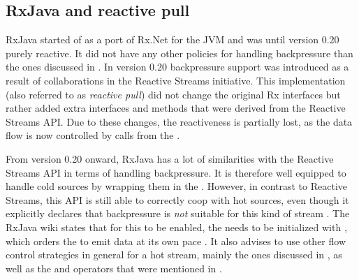 \subsection{RxJava and reactive pull}
\label{subsec:handling-overproduction-with-rxjava}
RxJava started of as a port of Rx.Net for the JVM and was until version 0.20 purely reactive. It did not have any other policies for handling backpressure than the ones discussed in . In version 0.20 backpressure support was introduced as a result of collaborations in the Reactive Streams initiative. This implementation (also referred to as \textit{reactive pull}) did not change the original Rx interfaces but rather added extra interfaces and methods that were derived from the Reactive Streams API. Due to these changes, the reactiveness is partially lost, as the data flow is now controlled by  calls from the \obv.

From version 0.20 onward, RxJava has a lot of similarities with the Reactive Streams API in terms of handling backpressure. It is therefore well equipped to handle cold sources by wrapping them in the \obs. However, in contrast to Reactive Streams, this API is still able to correctly coop with hot sources, even though it explicitly declares that backpressure is \emph{not} suitable for this kind of stream \cite{RxJava-Wiki-HotCold}. The RxJava wiki states that for this to be enabled, the \obs needs to be initialized with , which orders the \obs to emit data at its own pace \cite{RxJava-Wiki-Backpressure}. It also advises to use other flow control strategies in general for a hot stream, mainly the ones discussed in , as well as the  and  operators that were mentioned in .

